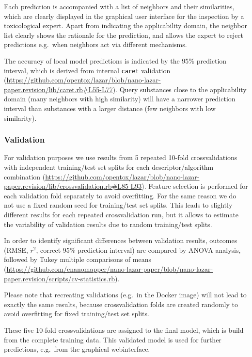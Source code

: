 \documentclass[utf8]{frontiersHLTH} %
\begin{document}
Each prediction is accompanied with a list of neighbors and their
similarities, which are clearly displayed in the graphical user
interface for the inspection by a toxicological expert. Apart from
indicating the applicability domain, the neighbor list clearly shows the
rationale for the prediction, and allows the expert to reject
predictions e.g.~when neighbors act via different mechanisms.

The accuracy of local model predictions is indicated by the 95\%
prediction interval, which is derived from internal \texttt{caret}
validation
(\url{https://github.com/opentox/lazar/blob/nano-lazar-paper.revision/lib/caret.rb\#L55-L77}).
Query substances close to the applicability domain (many neighbors with
high similarity) will have a narrower prediction interval than
substances with a larger distance (few neighbors with low similarity).

\subsubsection{Validation}\label{validation}

For validation purposes we use results from 5 repeated 10-fold
crossvalidations with independent training/test set splits for each
descriptor/algorithm combination
(\url{https://github.com/opentox/lazar/blob/nano-lazar-paper.revision/lib/crossvalidation.rb\#L85-L93}).
Feature selection is performed for each validation fold separately to
avoid overfitting. For the same reason we do not use a fixed random seed
for training/test set splits. This leads to slightly different results
for each repeated crossvalidation run, but it allows to estimate the
variability of validation results due to random training/test splits.

In order to identify significant differences between validation results,
outcomes (RMSE, \(r^2\), correct 95\% prediction interval) are compared
by ANOVA analysis, followed by Tukey multiple comparisons of means
(\url{https://github.com/enanomapper/nano-lazar-paper/blob/nano-lazar-paper.revision/scripts/cv-statistics.rb}).

Please note that recreating validations (e.g.~in the Docker image) will
not lead to exactly the same results, because crossvalidation folds are
created randomly to avoid overfitting for fixed training/test set
splits.

These five 10-fold crossvalidations are assigned to the final model,
which is build from the complete training data. This validated model is
used for further predictions, e.g.~from the graphical webinterface.
\end{document}
